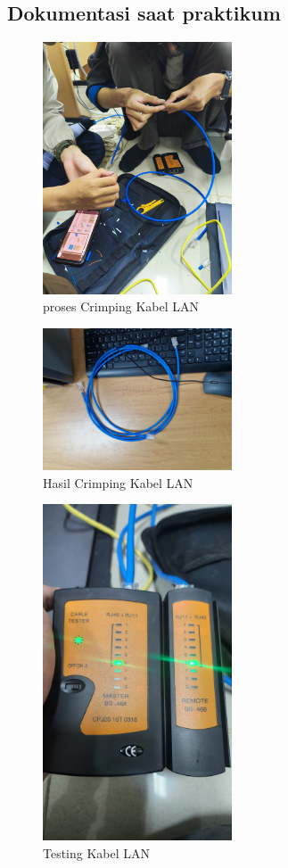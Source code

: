 \subsection{Dokumentasi saat praktikum}
\begin{figure}[H]
    \centering
    \includegraphics[width=0.5\textwidth]{P1/img/2.jpg}
    \caption{proses Crimping Kabel LAN}
    \label{fig:labelgambar}
\end{figure}
\begin{figure}[H]
    \centering
    \includegraphics[width=0.5\textwidth]{P1/img/1.jpg}
    \caption{Hasil Crimping Kabel LAN}
    \label{fig:labelgambar}
\end{figure}
\begin{figure}[H]
    \centering
    \includegraphics[width=0.5\textwidth]{P1/img/3.jpg}
    \caption{Testing Kabel LAN}
    \label{fig:labelgambar}
\end{figure}
